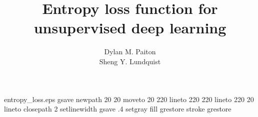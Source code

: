 %
%
%

\begin{filecontents*}{entropy_loss.eps}
gsave
newpath
  20 20 moveto
  20 220 lineto
  220 220 lineto
  220 20 lineto
closepath
2 setlinewidth
gsave
  .4 setgray fill
grestore
stroke
grestore
\end{filecontents*}

\RequirePackage{fix-cm}

\documentclass[smallextended]{svjour3}       %

\smartqed  %

\usepackage{graphicx}
\usepackage{amsmath}

\newcommand{\argmin}{\operatornamewithlimits{argmin}}
\newcommand{\tightoverset}[2]{\mathop{#2}\limits^{\vbox to -.6ex{\kern-0.75ex\hbox{$#1$}\vss}}}



\title{Entropy loss function for unsupervised deep learning
}



\author{
Dylan M. Paiton\\
Sheng Y. Lundquist
}  



\maketitle

